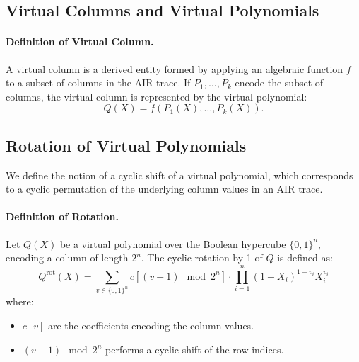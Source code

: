 \documentclass{article}
\begin{document}
\subsection{Virtual Columns and Virtual Polynomials}

\paragraph{Definition of Virtual Column.} A virtual column is a derived entity formed by applying an algebraic function \( f \) to a subset of columns in the AIR trace. If \( P_1, \dots, P_k \) encode the subset of columns, the virtual column is represented by the virtual polynomial:
\[
Q(X) = f(P_1(X), \dots, P_k(X)).
\]

\subsection{Rotation of Virtual Polynomials}

We define the notion of a cyclic shift of a virtual polynomial, which corresponds to a cyclic permutation of the underlying column values in an AIR trace.

\paragraph{Definition of Rotation.} Let \( Q(X) \) be a virtual polynomial over the Boolean hypercube \( \{0, 1\}^n \), encoding a column of length \( 2^n \). The cyclic rotation by 1 of \( Q \) is defined as:
\[
Q^{\text{rot}}(X) = \sum_{v \in \{0, 1\}^n} c[(v - 1) \mod 2^n] \cdot \prod_{i=1}^n (1 - X_i)^{1 - v_i} X_i^{v_i}
\]
where:
\begin{itemize}
    \item \( c[v] \) are the coefficients encoding the column values.
    \item \( (v - 1) \mod 2^n \) performs a cyclic shift of the row indices.
\end{itemize}
\end{document}
